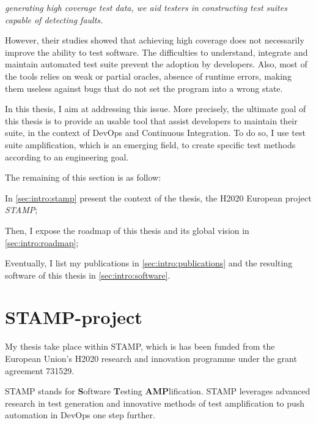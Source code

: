 \emph{generating high coverage test data, we aid testers in constructing test suites capable of detecting faults.}

However, their studies showed that achieving high coverage does not necessarily improve the ability to test software.
The difficulties to understand, integrate and maintain automated test suite prevent the adoption by developers.
Also, most of the tools relies on weak or partial oracles, \eg absence of runtime errors, making them useless against bugs that do not set the program into a wrong state.

In this thesis, I aim at addressing this issue.
More precisely, the ultimate goal of this thesis is to provide an usable tool that assist developers to maintain their suite, in the context of DevOps and Continuous Integration.
To do so, I use test suite amplification, which is an emerging field, to create specific test methods according to an engineering goal.

The remaining of this section is as follow:

In \autoref{sec:intro:stamp} present the context of the thesis, the H2020 European project \emph{STAMP};

Then, I expose the roadmap of this thesis and its global vision in \autoref{sec:intro:roadmap};

Eventually, I list my publications in \autoref{sec:intro:publications} and the resulting software of this thesis in \autoref{sec:intro:software}.

\section{STAMP-project}
\label{sec:intro:stamp}

My thesis take place within STAMP, which is has been funded from the European Union's H2020 research and innovation programme under the grant agreement 731529.

STAMP stands for \textbf{S}oftware \textbf{T}esting \textbf{AMP}lification.
STAMP leverages advanced research in test generation and innovative methods of test amplification to push automation in DevOps one step further.


